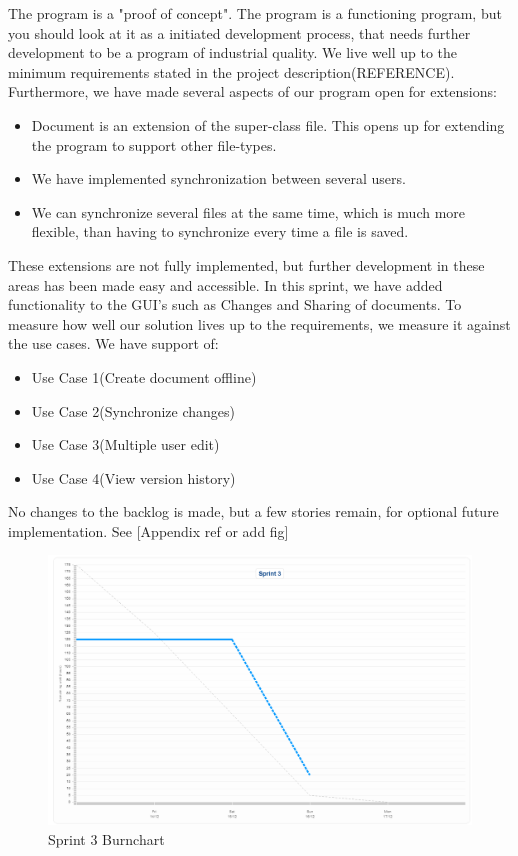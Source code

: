 The program is a "proof of concept". The program is a functioning program, but you should look at it as a initiated development process, that needs further development to be a program of industrial quality. We live well up to the minimum requirements stated in the project description(REFERENCE). Furthermore, we have made several aspects of our program open for extensions:
\begin{itemize}
\item Document is an extension of the super-class file. This opens up for extending the program to support other file-types.
\item We have implemented synchronization between several users.
\item We can synchronize several files at the same time, which is much more flexible, than having to synchronize every time a file is saved.
\end{itemize}
These extensions are not fully implemented, but further development in these areas has been made easy and accessible.
In this sprint, we have added functionality to the GUI's such as Changes and Sharing of documents. To measure how well our solution lives up to the requirements, we measure it against the use cases. We have support of:
\begin{itemize}
\item Use Case 1(Create document offline) 
\item Use Case 2(Synchronize changes) 
\item Use Case 3(Multiple user edit) 
\item Use Case 4(View version history)
\end{itemize}
No changes to the backlog is made, but a few stories remain, for optional future implementation. See [Appendix ref or add fig]
\begin{figure}[H]
  \includegraphics[width=\textwidth]{illustrations/sprint3burn.PNG}
  \caption{Sprint 3 Burnchart}
  \label{sprint3burnchart}
\end{figure}
